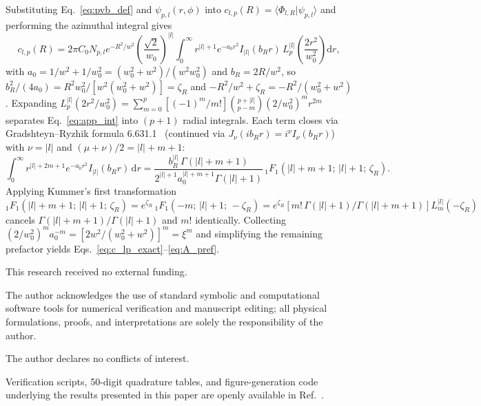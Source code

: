 \documentclass{optica-article}
\newcommand{\braket}[2]{\langle #1 | #2 \rangle}
\newcommand{\abs}[1]{\lvert #1 \rvert}
\newcommand{\dd}{\mathrm{d}}
\begin{document}
Substituting Eq.~\eqref{eq:pvb_def} and $\psi_{p,l}(r,\phi)$ into $c_{l,p}(R) = \braket{\Phi_{l,R}}{\psi_{p,l}}$ and performing the azimuthal integral gives
\begin{equation}
  c_{l,p}(R) = 2\pi C_0 N_{p,l} e^{-R^2/w^2}\left(\frac{\sqrt{2}}{w_0}\right)^{\abs{l}} \int_0^\infty r^{\abs{l}+1} e^{-a_0 r^2} I_{\abs{l}}(b_R r)\,L_p^{\abs{l}}\!\left(\frac{2r^2}{w_0^2}\right)\dd r,
  \label{eq:app_int}
\end{equation}
with $a_0 = 1/w^2 + 1/w_0^2 = (w_0^2+w^2)/(w^2 w_0^2)$ and $b_R = 2R/w^2$, so $b_R^2/(4a_0) = R^2 w_0^2/[w^2(w_0^2+w^2)] = \zeta_R$ and $-R^2/w^2 + \zeta_R = -R^2/(w_0^2+w^2)$. Expanding $L_p^{\abs{l}}(2r^2/w_0^2) = \sum_{m=0}^p [(-1)^m/m!]\allowbreak\binom{p+\abs{l}}{p-m}(2/w_0^2)^m r^{2m}$ separates Eq.~\eqref{eq:app_int} into $(p+1)$ radial integrals. Each term closes via Gradshteyn--Ryzhik formula 6.631.1~\cite{Gradshteyn2014} (continued via $J_\nu(i b_R r) = i^\nu I_\nu(b_R r)$) with $\nu = \abs{l}$ and $(\mu+\nu)/2 = \abs{l}+m+1$:
\begin{equation}
  \int_0^\infty r^{\abs{l}+2m+1} e^{-a_0 r^2} I_{\abs{l}}(b_R r)\,\dd r = \frac{b_R^{\abs{l}}\,\Gamma(\abs{l}+m+1)}{2^{\abs{l}+1} a_0^{\abs{l}+m+1}\Gamma(\abs{l}+1)}\,{}_1F_1(\abs{l}+m+1;\,\abs{l}+1;\,\zeta_R).
\end{equation}
Applying Kummer's first transformation ${}_1F_1(\abs{l}+m+1;\,\abs{l}+1;\,\zeta_R) = e^{\zeta_R}\,{}_1F_1(-m;\,\abs{l}+1;\,-\zeta_R) = e^{\zeta_R}[m!\,\Gamma(\abs{l}+1)/\Gamma(\abs{l}+m+1)]L_m^{\abs{l}}(-\zeta_R)$ cancels $\Gamma(\abs{l}+m+1)/\Gamma(\abs{l}+1)$ and $m!$ identically. Collecting $(2/w_0^2)^m a_0^{-m} = [2w^2/(w_0^2+w^2)]^m = \xi^m$ and simplifying the remaining prefactor yields Eqs.~\eqref{eq:c_lp_exact}--\eqref{eq:A_pref}.

\begin{backmatter}
This research received no external funding.

The author acknowledges the use of standard symbolic and computational software tools for numerical verification and manuscript editing; all physical formulations, proofs, and interpretations are solely the responsibility of the author.

The author declares no conflicts of interest.

Verification scripts, 50-digit quadrature tables, and figure-generation code underlying the results presented in this paper are openly available in Ref.~\cite{AyalaCodeV15}.
\end{backmatter}


\end{document}
